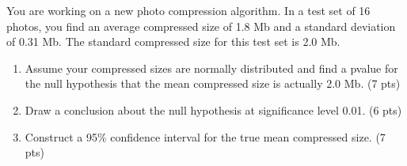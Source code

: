 \item You are working on a new photo compression algorithm. In a test set of 16 
photos, you find an average compressed size of 1.8 Mb and a standard deviation
of 0.31 Mb. The standard compressed size for this test set is 2.0 Mb.

\begin{enumerate}
\item Assume your compressed sizes are normally distributed and find a pvalue
for the null hypothesis that the mean compressed size is actually 2.0 Mb. (7 pts)

\vfill\vfill\vfill

\item Draw a conclusion about the null hypothesis at significance level 0.01. (6 pts)

\vfill\vfill

\item Construct a 95\% confidence interval for the true mean compressed size. (7 pts)

\ansfont{
\[
1.8 \pm t_{15,0.025} 0.31/\sqrt{16} = (1.63,1.97)
\]
}
\vfill\vfill\vfill

\end{enumerate}
